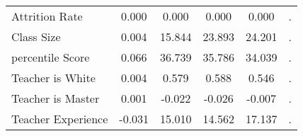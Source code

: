 \documentclass{article}
\begin{document}
\begin{table}[htbp]
\begin{tabular}{llccccc}
    \multicolumn{2}{l}{Attrition Rate} & 0.000  & 0.000  & 0.000  & 0.000  & . \\
    \multicolumn{2}{l}{Class Size} & 0.004  & 15.844  & 23.893  & 24.201  & . \\
    \multicolumn{2}{l}{percentile Score} & 0.066  & 36.739  & 35.786  & 34.039  & . \\
    \multicolumn{2}{l}{Teacher is White} & 0.004  & 0.579  & 0.588  & 0.546  & . \\
    \multicolumn{2}{l}{Teacher is Master} & 0.001  & -0.022  & -0.026  & -0.007  & . \\
    \multicolumn{2}{l}{Teacher Experience} & -0.031  & 15.010  & 14.562  & 17.137  & . \\
    \bottomrule
    \bottomrule
    \end{tabular}%
  \label{tab:addlabel}%
\end{table}%


\end{document}
